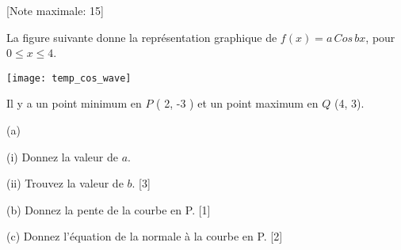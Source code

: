 \begin{question}
  \hspace*{\fill} [Note maximale: 15]\par
  \medskip
  \noindent La figure suivante donne la représentation graphique de $f(x) = a\,Cos\,bx $, pour $ 0 \le x \le 4$.\par  
  \medskip
  \texttt{[image: temp\_cos\_wave]}\par
  \medskip
  \noindent Il y a un point minimum en $P$ ( 2, -3 ) et un point maximum en $Q$ (4, 3).\par
  \medskip
  (a)\par
  \hspace{1em} (i)  Donnez la valeur de $a$.\par
  \medskip
  \hspace{1em} (ii) Trouvez la valeur de $b$.\hspace*{\fill} [3]\par
  \medskip
  (b) Donnez la pente de la courbe en P.\hspace*{\fill} [1]\par
  \medskip
  (c) Donnez l’équation de la normale à la courbe en P.\hspace*{\fill} [2]\par
  \medskip
\end{question}

